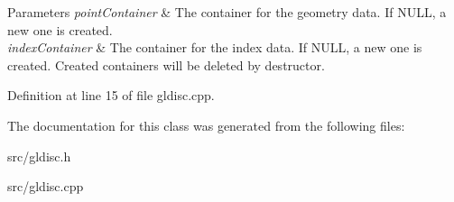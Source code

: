 \begin{DoxyParams}{Parameters}
{\em point\+Container} & The container for the geometry data. If N\+U\+LL, a new one is created. \\
\hline
{\em index\+Container} & The container for the index data. If N\+U\+LL, a new one is created. Created containers will be deleted by destructor. \\
\hline
\end{DoxyParams}


Definition at line 15 of file gldisc.\+cpp.



The documentation for this class was generated from the following files\+:\begin{DoxyCompactItemize}
\item 
src/gldisc.\+h\item 
src/gldisc.\+cpp\end{DoxyCompactItemize}
